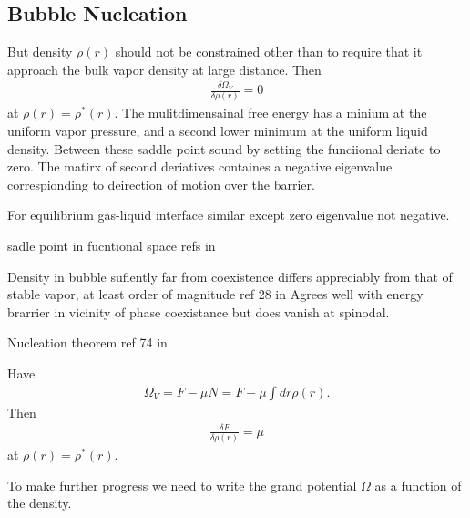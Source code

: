 {%



\subsection{Bubble Nucleation}




But density $\rho(r)$ should not be constrained other than to require that it approach the bulk vapor density at large distance.
Then 
\begin{align}
  \frac{\delta \Omega_V}{\delta \rho(r)} = 0
\end{align}
at $\rho(r) = \rho^\ast(r)$.
The mulitdimensainal free energy has a minium at the uniform vapor pressure,
and a second lower minimum at the  uniform liquid density. Between these saddle point sound by setting the funciional deriate to zero.
The matirx of second deriatives containes a negative eigenvalue correspionding to deirection of motion over the barrier.

For equilibrium gas-liquid interface similar except zero eigenvalue not negative. 

sadle point in fucntional space refs in \cite{shen2003}

Density in bubble sufiently far from coexistence differs appreciably from that of stable vapor,
at least order of magnitude ref 28 in \cite{Shen2003}
Agrees well with energy brarrier in vicinity of phase coexistance but does vanish at spinodal.

Nucleation theorem ref 74 in \cite{shen2003}

Have
\begin{align}
\Omega_V = F - \mu N = F - \mu \int dr \rho(r).
\end{align}
Then \begin{align}
\frac{\delta F}{\delta \rho(r)} = \mu
\end{align}
at $\rho(r) = \rho^\ast(r)$.


To make further progress we need to write the grand potential $\Omega$ as a function of the density.

}
